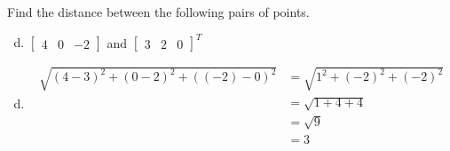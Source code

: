 \documentclass[../main.tex]{subfiles}
\begin{document}
Find the distance between the following pairs of points.
\begin{enumerate}[a)]
	\setcounter{enumi}{3}
	\item 
		$\begin{bmatrix}4&0&-2\end{bmatrix}$
		and
		$\begin{bmatrix}3&2&0\end{bmatrix}^T$
\end{enumerate}

\solution
\begin{enumerate}[a)]
	\setcounter{enumi}{3}
	\item
		\begin{align*}
			\sqrt{(4 - 3)^2 + (0 - 2)^2 + ((-2) - 0)^2} &= \sqrt{1^2 + (-2)^2 + (-2)^2} \\
			&= \sqrt{1 + 4 + 4} \\
			&= \sqrt{9} \\
			&= 3
		\end{align*}
\end{enumerate}
\end{document}
